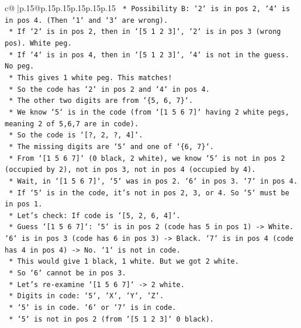 \documentclass{article}
\begin{document}
{\begin{supertabular}{c@{$\;$}|p{.15\linewidth}@{}p{.15\linewidth}p{.15\linewidth}p{.15\linewidth}p{.15\linewidth}p{.15\linewidth}}
{{{\texttt{        *   Possibility B: `2` is in pos 2, `4` is in pos 4. (Then `1` and `3` are wrong).} \\
\texttt{            *   If `2` is in pos 2, then in `{[}5 1 2 3{]}`, `2` is in pos 3 (wrong pos). White peg.} \\
\texttt{            *   If `4` is in pos 4, then in `{[}5 1 2 3{]}`, `4` is not in the guess. No peg.} \\
\texttt{            *   This gives 1 white peg. This matches!} \\
\texttt{            *   So the code has `2` in pos 2 and `4` in pos 4.} \\
\texttt{            *   The other two digits are from `\{5, 6, 7\}`.} \\
\texttt{            *   We know `5` is in the code (from `{[}1 5 6 7{]}` having 2 white pegs, meaning 2 of 5,6,7 are in code).} \\
\texttt{            *   So the code is `{[}?, 2, ?, 4{]}`.} \\
\texttt{            *   The missing digits are `5` and one of `\{6, 7\}`.} \\
\texttt{            *   From `{[}1 5 6 7{]}` (0 black, 2 white), we know `5` is not in pos 2 (occupied by 2), not in pos 3, not in pos 4 (occupied by 4).} \\
\texttt{            *   Wait, in `{[}1 5 6 7{]}`, `5` was in pos 2. `6` in pos 3. `7` in pos 4.} \\
\texttt{            *   If `5` is in the code, it's not in pos 2, 3, or 4. So `5` must be in pos 1.} \\
\texttt{            *   Let's check: If code is `{[}5, 2, 6, 4{]}`.} \\
\texttt{                *   Guess `{[}1 5 6 7{]}`: `5` is in pos 2 (code has 5 in pos 1) {-}> White. `6` is in pos 3 (code has 6 in pos 3) {-}> Black. `7` is in pos 4 (code has 4 in pos 4) {-}> No. `1` is not in code.} \\
\texttt{                *   This would give 1 black, 1 white. But we got 2 white.} \\
\texttt{                *   So `6` cannot be in pos 3.} \\
\texttt{            *   Let's re{-}examine `{[}1 5 6 7{]}` {-}> 2 white.} \\
\texttt{                *   Digits in code: `5`, `X`, `Y`, `Z`.} \\
\texttt{                *   `5` is in code. `6` or `7` is in code.} \\
\texttt{                *   `5` is not in pos 2 (from `{[}5 1 2 3{]}` 0 black).} \\
}}}
\end{supertabular}}
\end{document}
